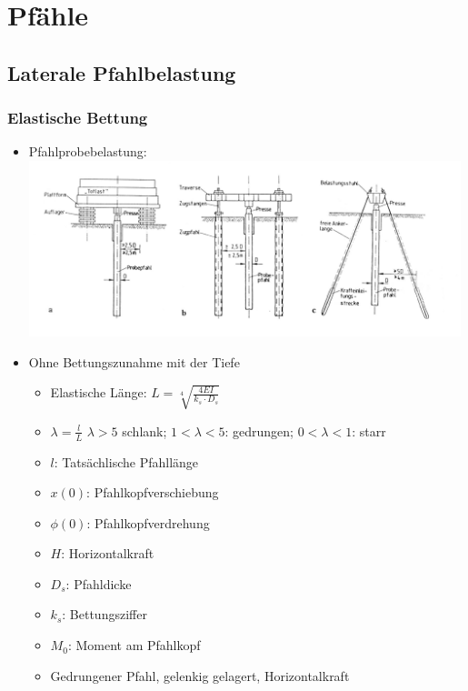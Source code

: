 \documentclass[fleqn,twoside]{article}
\begin{document}
\section{Pfähle}

\subsection{Laterale Pfahlbelastung}

\subsubsection{Elastische Bettung}

\begin{itemize}
    \item Pfahlprobebelastung:\\
        \includegraphics[width=0.99\textwidth]{Grafiken/Pfahlprobebelastung.png}
    \item Ohne Bettungszunahme mit der Tiefe
    \begin{itemize}
        \item Elastische Länge: $L=\sqrt[4]{\frac{4EI}{k_s\cdot D_s}}$
        \item $\lambda=\frac lL$ $\lambda>5$ schlank; $1<\lambda<5$: gedrungen; $0<\lambda<1$: starr
        \item $l$: Tatsächlische Pfahllänge
        \item $x(0)$: Pfahlkopfverschiebung
        \item $\phi(0)$: Pfahlkopfverdrehung
        \item $H$: Horizontalkraft
        \item $D_s$: Pfahldicke
        \item $k_s$: Bettungsziffer
        \item $M_0$: Moment am Pfahlkopf
        \item Gedrungener Pfahl, gelenkig gelagert, Horizontalkraft
        \begin{itemize}

\end{itemize}
\end{itemize}
\end{itemize}
\end{document}
